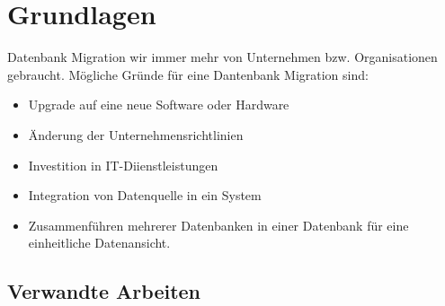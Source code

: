 \chapter{Grundlagen}
Datenbank Migration wir immer mehr von Unternehmen bzw. Organisationen gebraucht. 
Mögliche Gründe für eine Dantenbank Migration sind:
\begin{itemize}
	\item Upgrade auf eine neue Software oder Hardware
	\item Änderung der Unternehmensrichtlinien
	\item Investition in IT-Diienstleistungen
	\item Integration von Datenquelle in ein System
	\item Zusammenführen mehrerer Datenbanken in einer Datenbank für eine einheitliche Datenansicht.
\end{itemize}

\section{Verwandte Arbeiten}